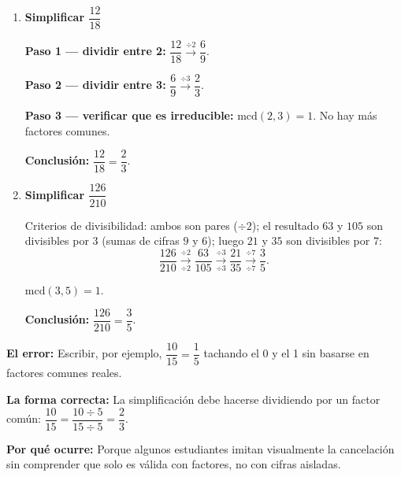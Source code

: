 \documentclass[11pt, letterpaper]{article}
\begin{document}
\begin{tcolorbox}[examplebox, title={Ejemplos --- Simplificaci\'on sucesiva por primos}]
\begin{enumerate}[label=\textbf{Ej. \arabic*.}, leftmargin=*, itemsep=14pt]

\item \textbf{Simplificar $\dfrac{12}{18}$}

\textbf{Paso 1 --- dividir entre 2:}
$\dfrac{12}{18}\xrightarrow{\div 2}\dfrac{6}{9}$.

\medskip
\textbf{Paso 2 --- dividir entre 3:}
$\dfrac{6}{9}\xrightarrow{\div 3}\dfrac{2}{3}$.

\medskip
\textbf{Paso 3 --- verificar que es irreducible:}
$\text{mcd}(2,3)=1$. No hay m\'as factores comunes.

\medskip
\textbf{Conclusi\'on:}
$\dfrac{12}{18}=\dfrac{2}{3}$.

\item \textbf{Simplificar $\dfrac{126}{210}$}

Criterios de divisibilidad: ambos son pares ($\div2$); el resultado $63$ y $105$ son divisibles por $3$ (sumas de cifras $9$ y $6$); luego $21$ y $35$ son divisibles por $7$:
$$\frac{126}{210}\xrightarrow[\div 2]{\div 2}\frac{63}{105}\xrightarrow[\div 3]{\div 3}\frac{21}{35}\xrightarrow[\div 7]{\div 7}\frac{3}{5}.$$

$\text{mcd}(3,5)=1$. \checkmark

\medskip
\textbf{Conclusi\'on:}
$\dfrac{126}{210}=\dfrac{3}{5}$.

\end{enumerate}
\end{tcolorbox}

\begin{tcolorbox}[warningbox, title={Error frecuente --- "Tachar" n\'umeros sin justificar}]
\noindent\textbf{El error:}
Escribir, por ejemplo, $\dfrac{10}{15}=\dfrac{1}{5}$ tachando el 0 y el 1 sin basarse en factores comunes reales.

\medskip
\noindent\textbf{La forma correcta:}
La simplificaci\'on debe hacerse dividiendo por un factor com\'un: $\dfrac{10}{15}=\dfrac{10\div 5}{15\div 5}=\dfrac{2}{3}$.

\medskip
\noindent\textbf{Por qu\'e ocurre:}
Porque algunos estudiantes imitan visualmente la cancelaci\'on sin comprender que solo es v\'alida con factores, no con cifras aisladas.
\end{tcolorbox}
\end{document}
